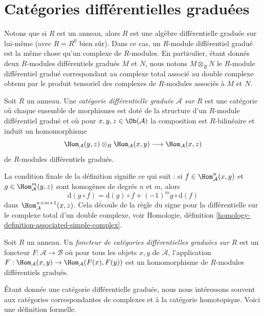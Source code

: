 \section{Catégories différentielles graduées}
\label{section-dga-categories}

\noindent
Notons que si $R$ est un anneau, alors $R$ est une algèbre
différentielle graduée sur lui-même (avec $R = R^0$ bien sûr). Dans ce cas, un
$R$-module différentiel gradué est la même chose qu'un complexe de
$R$-modules. En particulier, étant donnés deux $R$-modules différentiels
gradués $M$ et $N$, nous notons $M \otimes_R N$ le $R$-module
différentiel gradué correspondant au complexe total associé au
double complexe obtenu par le produit tensoriel des complexes de $R$-modules
associés à $M$ et $N$.

\begin{definition}
\label{definition-dga-category}
Soit $R$ un anneau. Une {\it catégorie différentielle graduée
$\mathcal{A}$ sur $R$} est une catégorie où chaque ensemble de morphismes est doté de la
structure d'un $R$-module différentiel gradué et où pour
$x, y, z \in \Ob(\mathcal{A})$ la composition est $R$-bilinéaire et induit un
homomorphisme
$$
\Hom_\mathcal{A}(y, z) \otimes_R \Hom_\mathcal{A}(x, y)
\longrightarrow
\Hom_\mathcal{A}(x, z)
$$
de $R$-modules différentiels gradués.
\end{definition}

\noindent
La condition finale de la définition signifie ce qui suit :
si $f \in \Hom_\mathcal{A}^n(x, y)$ et
$g \in \Hom_\mathcal{A}^m(y, z)$ sont homogènes
de degrés $n$ et $m$, alors
$$
\text{d}(g \circ f) = \text{d}(g) \circ f + (-1)^mg \circ \text{d}(f)
$$
dans $\Hom_\mathcal{A}^{n + m + 1}(x, z)$. Cela découle de la règle du
signe pour la différentielle sur le complexe total d'un double complexe,
voir Homologie, définition \ref{homology-definition-associated-simple-complex}.

\begin{definition}
\label{definition-functor-dga-categories}
Soit $R$ un anneau. Un {\it foncteur de catégories différentielles graduées sur $R$}
est un foncteur $F : \mathcal{A} \to \mathcal{B}$ où pour tous les objets
$x, y$ de $\mathcal{A}$,
l'application $F : \Hom_\mathcal{A}(x, y) \to \Hom_\mathcal{A}(F(x), F(y))$
est un homomorphisme de $R$-modules différentiels gradués.
\end{definition}

\noindent
Étant donnée une catégorie différentielle graduée, nous nous intéressons souvent
aux catégories correspondantes de complexes et à la catégorie
homotopique. Voici une définition formelle.

